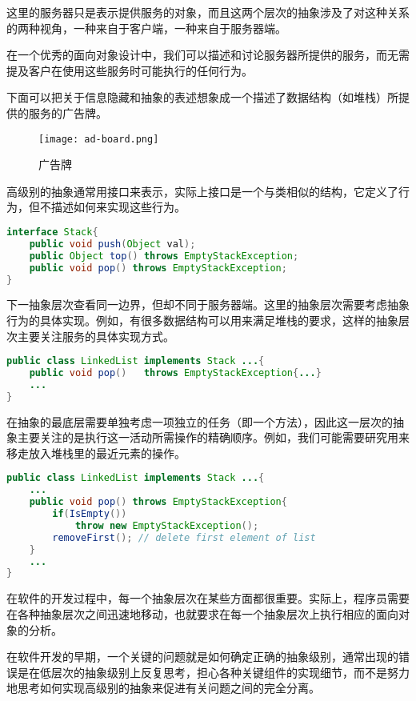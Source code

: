 这里的服务器只是表示提供服务的对象，而且这两个层次的抽象涉及了对这种关系的两种视角，一种来自于客户端，一种来自于服务器端。


在一个优秀的面向对象设计中，我们可以描述和讨论服务器所提供的服务，而无需提及客户在使用这些服务时可能执行的任何行为。

下面可以把关于信息隐藏和抽象的表述想象成一个描述了数据结构（如堆栈）所提供的服务的广告牌。


\begin{figure}[htbp]
\centering
\texttt{[image: ad-board.png]}
\caption{广告牌}
\label{fig:ad-board}
\end{figure}

高级别的抽象通常用接口来表示，实际上接口是一个与类相似的结构，它定义了行为，但不描述如何来实现这些行为。

\begin{lstlisting}[language=Java]
interface Stack{
	public void push(Object val);
	public Object top() throws EmptyStackException;
	public void pop() throws EmptyStackException;
}
\end{lstlisting}


下一抽象层次查看同一边界，但却不同于服务器端。这里的抽象层次需要考虑抽象行为的具体实现。例如，有很多数据结构可以用来满足堆栈的要求，这样的抽象层次主要关注服务的具体实现方式。

\begin{lstlisting}[language=Java]
public class LinkedList implements Stack ...{
	public void pop()	throws EmptyStackException{...}
	...
}
\end{lstlisting}


在抽象的最底层需要单独考虑一项独立的任务（即一个方法），因此这一层次的抽象主要关注的是执行这一活动所需操作的精确顺序。例如，我们可能需要研究用来移走放入堆栈里的最近元素的操作。

\begin{lstlisting}[language=Java]
public class LinkedList implements Stack ...{
	...
	public void pop() throws EmptyStackException{
		if(IsEmpty())
			throw new EmptyStackException();
		removeFirst(); // delete first element of list
	}
	...	
}
\end{lstlisting}

在软件的开发过程中，每一个抽象层次在某些方面都很重要。实际上，程序员需要在各种抽象层次之间迅速地移动，也就要求在每一个抽象层次上执行相应的面向对象的分析。

在软件开发的早期，一个关键的问题就是如何确定正确的抽象级别，通常出现的错误是在低层次的抽象级别上反复思考，担心各种关键组件的实现细节，而不是努力地思考如何实现高级别的抽象来促进有关问题之间的完全分离。

